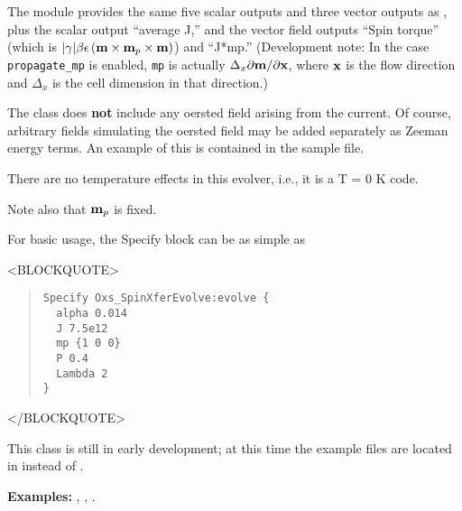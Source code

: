 \begin{description}
The  module provides the same five scalar
outputs and three vector outputs as , plus the
scalar output ``average J,'' and the vector field outputs ``Spin
torque'' (which is
$|\gamma|\beta\epsilon\left(\textbf{m}\times\textbf{m}_p\times\textbf{m}\right)$) and
``J*mp.''  (Development note: In the case \texttt{propagate\_mp} is
enabled, \texttt{mp} is actually $\Delta_x\partial\textbf{m}/\partial\textbf{x}$,
where $\textbf{x}$ is the flow direction and $\Delta_x$ is the cell dimension
in that direction.)

The  class does \textbf{not} include any oersted
field arising from the current.  Of course, arbitrary fields simulating
the oersted field may be added separately as Zeeman energy terms.  An
example of this is contained in the  sample file.

There are no temperature effects in this evolver, i.e., it is a T = 0 K
code.

Note also that $\textbf{m}_p$ is fixed.

For basic usage, the Specify block can be as simple as
\begin{rawhtml}<BLOCKQUOTE>\end{rawhtml}
\begin{quote}
\begin{verbatim}
Specify Oxs_SpinXferEvolve:evolve {
  alpha 0.014
  J 7.5e12
  mp {1 0 0}
  P 0.4
  Lambda 2
}
\end{verbatim}
\end{quote}
\begin{rawhtml}</BLOCKQUOTE>\end{rawhtml}

This class is still in early development; at this time the example files
are located in  instead of
.

\textbf{Examples:} , ,
.


\end{description}

